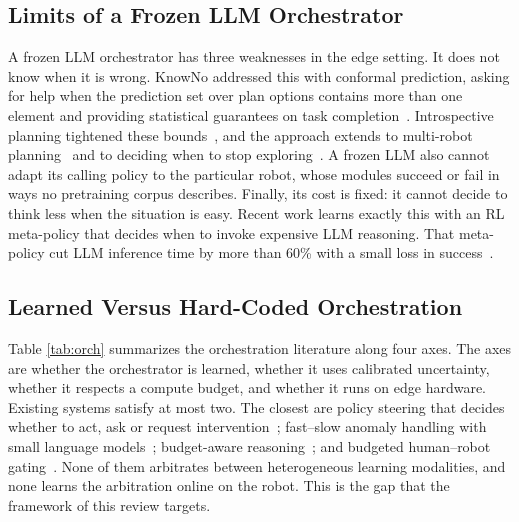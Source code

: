 \documentclass[journal]{IEEEtran}
\begin{document}
\subsection{Limits of a Frozen LLM Orchestrator}\label{sec:frozen}
A frozen LLM orchestrator has three weaknesses in the edge setting. It does not know when it is wrong. KnowNo addressed this with conformal prediction, asking for help when the prediction set over plan options contains more than one element and providing statistical guarantees on task completion~\cite{Ren2023}. Introspective planning tightened these bounds~\cite{Liang2024}, and the approach extends to multi-robot planning~\cite{Wang2024c} and to deciding when to stop exploring~\cite{Ren2024}. A frozen LLM also cannot adapt its calling policy to the particular robot, whose modules succeed or fail in ways no pretraining corpus describes. Finally, its cost is fixed: it cannot decide to think less when the situation is easy. Recent work learns exactly this with an RL meta-policy that decides when to invoke expensive LLM reasoning. That meta-policy cut LLM inference time by more than 60\% with a small loss in success~\cite{Liu2026}.


\subsection{Learned Versus Hard-Coded Orchestration}\label{sec:gap}
Table \ref{tab:orch} summarizes the orchestration literature along four axes. The axes are whether the orchestrator is learned, whether it uses calibrated uncertainty, whether it respects a compute budget, and whether it runs on edge hardware. Existing systems satisfy at most two. The closest are policy steering that decides whether to act, ask or request intervention~\cite{Yuan2026}; fast--slow anomaly handling with small language models~\cite{Sinha2024}; budget-aware reasoning~\cite{Liu2026}; and budgeted human--robot gating~\cite{Hoque2021}. None of them arbitrates between heterogeneous learning modalities, and none learns the arbitration online on the robot. This is the gap that the framework of this review targets.
\end{document}
